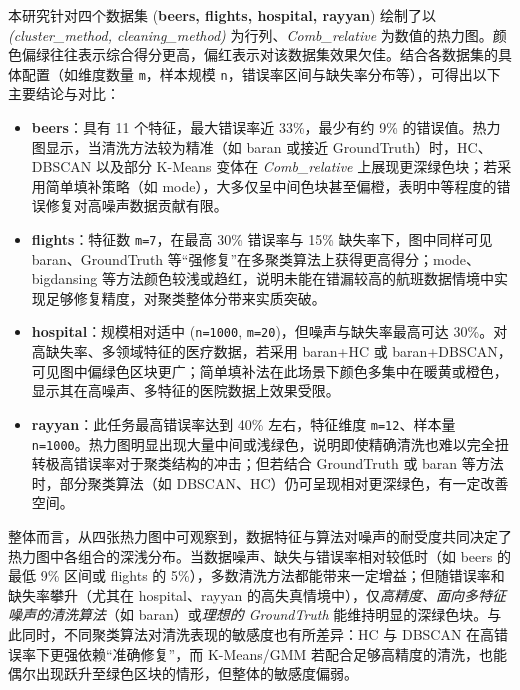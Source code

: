 \documentclass[10pt]{article} %
\numberwithin{equation}{section}
\begin{document}
\begin{enumerate}[label=(\alph*)]
本研究针对四个数据集 (\textbf{beers, flights, hospital, rayyan}) 绘制了以 \textit{(cluster\_method, cleaning\_method)} 为行列、\textit{Comb\_relative} 为数值的热力图。颜色偏绿往往表示综合得分更高，偏红表示对该数据集效果欠佳。结合各数据集的具体配置（如维度数量 \texttt{m}，样本规模 \texttt{n}，错误率区间与缺失率分布等），可得出以下主要结论与对比：

\begin{itemize}
    \item \textbf{beers}：具有 11 个特征，最大错误率近 33\%，最少有约 9\% 的错误值。热力图显示，当清洗方法较为精准（如 baran 或接近 GroundTruth）时，HC、DBSCAN 以及部分 K-Means 变体在 \textit{Comb\_relative} 上展现更深绿色块；若采用简单填补策略（如 mode），大多仅呈中间色块甚至偏橙，表明中等程度的错误修复对高噪声数据贡献有限。

    \item \textbf{flights}：特征数 \texttt{m=7}，在最高 30\% 错误率与 15\% 缺失率下，图中同样可见 baran、GroundTruth 等“强修复”在多聚类算法上获得更高得分；mode、bigdansing 等方法颜色较浅或趋红，说明未能在错漏较高的航班数据情境中实现足够修复精度，对聚类整体分带来实质突破。

    \item \textbf{hospital}：规模相对适中 (\texttt{n=1000}, \texttt{m=20})，但噪声与缺失率最高可达 30\%。对高缺失率、多领域特征的医疗数据，若采用 baran+HC 或 baran+DBSCAN，可见图中偏绿色区块更广；简单填补法在此场景下颜色多集中在暖黄或橙色，显示其在高噪声、多特征的医院数据上效果受限。

    \item \textbf{rayyan}：此任务最高错误率达到 40\% 左右，特征维度 \texttt{m=12}、样本量 \texttt{n=1000}。热力图明显出现大量中间或浅绿色，说明即使精确清洗也难以完全扭转极高错误率对于聚类结构的冲击；但若结合 GroundTruth 或 baran 等方法时，部分聚类算法（如 DBSCAN、HC）仍可呈现相对更深绿色，有一定改善空间。
\end{itemize}

\noindent
整体而言，从四张热力图中可观察到，数据特征与算法对噪声的耐受度共同决定了热力图中各组合的深浅分布。当数据噪声、缺失与错误率相对较低时（如 beers 的最低 9\% 区间或 flights 的 5\%），多数清洗方法都能带来一定增益；但随错误率和缺失率攀升（尤其在 hospital、rayyan 的高失真情境中），仅\textit{高精度、面向多特征噪声的清洗算法}（如 baran）或\textit{理想的 GroundTruth} 能维持明显的深绿色块。与此同时，不同聚类算法对清洗表现的敏感度也有所差异：HC 与 DBSCAN 在高错误率下更强依赖“准确修复”，而 K-Means/GMM 若配合足够高精度的清洗，也能偶尔出现跃升至绿色区块的情形，但整体的敏感度偏弱。


\end{enumerate}
\end{document}
